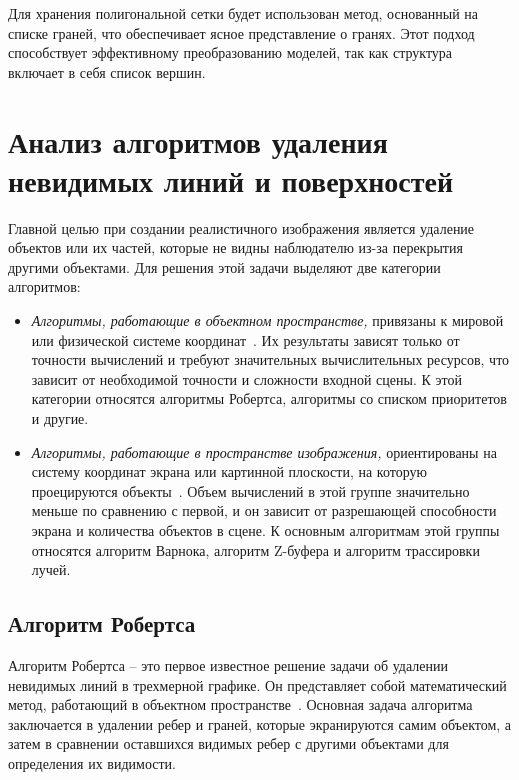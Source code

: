 Для хранения полигональной сетки будет использован метод, основанный на списке граней, что обеспечивает ясное представление о гранях. Этот подход способствует эффективному преобразованию моделей, так как структура включает в себя список вершин.

\clearpage

\section{Анализ алгоритмов удаления невидимых линий и поверхностей}

Главной целью при создании реалистичного изображения является удаление объектов или их частей, которые не видны наблюдателю из-за перекрытия другими объектами. Для решения этой задачи выделяют две категории алгоритмов:

\begin{itemize}[label=--]
	\item \textit{Алгоритмы, работающие в объектном пространстве,} привязаны к мировой или физической системе координат~\cite{lit3}. Их результаты зависят только от точности вычислений и требуют значительных вычислительных ресурсов, что зависит от необходимой точности и сложности входной сцены. К этой категории относятся алгоритмы Робертса, алгоритмы со списком приоритетов и другие.
	
	\item \textit{Алгоритмы, работающие в пространстве изображения,} ориентированы на систему координат экрана или картинной плоскости, на которую проецируются объекты~\cite{lit3}. Объем вычислений в этой группе значительно меньше по сравнению с первой, и он зависит от разрешающей способности экрана и количества объектов в сцене. К основным алгоритмам этой группы относятся алгоритм Варнока, алгоритм Z-буфера и алгоритм трассировки лучей.
\end{itemize}

\subsection{Алгоритм Робертса}

Алгоритм Робертса -- это первое известное решение задачи об удалении невидимых линий в трехмерной графике. Он представляет собой математический метод, работающий в объектном пространстве~\cite{lit3}. Основная задача алгоритма заключается в удалении ребер и граней, которые экранируются самим объектом, а затем в сравнении оставшихся видимых ребер с другими объектами для определения их видимости.

